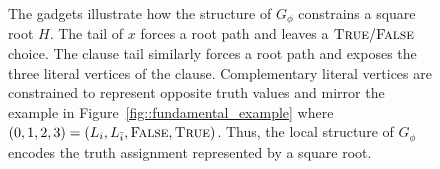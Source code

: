 \begin{figure}[H]

    \caption{
    The gadgets illustrate how the structure of $G_\phi$ constrains a square root $H$. The tail of $x$ forces a root path and leaves a $\textsc{True}/\textsc{False}$ choice. The clause tail similarly forces a root path and exposes the three literal vertices of the clause. Complementary literal vertices are constrained to represent opposite truth values and mirror the example in Figure~\ref{fig::fundamental_example} where $(0,1,2,3) = (L_i, L_{\bar i}, \textsc{False}, \textsc{True})$. Thus, the local structure of $G_\phi$ encodes the truth assignment represented by a square root.
    }
    \label{fig:polynomial-reduction-gadgets}
\end{figure}